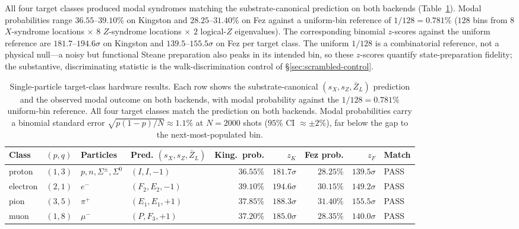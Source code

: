 \documentclass[11pt]{article}
\newcommand{\barZ}{\bar Z_L}
\begin{document}
All four target classes produced modal syndromes matching the substrate-canonical prediction on both backends (Table~\ref{tab:phase2-target-results}).  Modal probabilities range $36.55$--$39.10\%$ on Kingston and $28.25$--$31.40\%$ on Fez against a uniform-bin reference of $1 / 128 = 0.781\%$ ($128$ bins from $8$ $X$-syndrome locations $\times$ $8$ $Z$-syndrome locations $\times$ $2$ logical-$Z$ eigenvalues).  The corresponding binomial $z$-scores against the uniform reference are $181.7$--$194.6\sigma$ on Kingston and $139.5$--$155.5\sigma$ on Fez per target class.  The uniform $1/128$ is a combinatorial reference, not a physical null---a noisy but functional Steane preparation also peaks in its intended bin, so these $z$-scores quantify state-preparation fidelity; the substantive, discriminating statistic is the walk-discrimination control of \S\ref{sec:scrambled-control}.

\begin{table}[H]
\centering
\caption{Single-particle target-class hardware results.  Each row shows the substrate-canonical $(s_X, s_Z, \barZ)$ prediction and the observed modal outcome on both backends, with modal probability against the $1 / 128 = 0.781\%$ uniform-bin reference.  All four target classes match the prediction on both backends.  Modal probabilities carry a binomial standard error $\sqrt{p(1-p)/N} \approx 1.1\%$ at $N = 2000$ shots ($95\%$ CI $\approx \pm 2\%$), far below the gap to the next-most-populated bin.}
\label{tab:phase2-target-results}
\small
\begin{tabular}{llllrrrrl}
\toprule
Class & $(p, q)$ & Particles & Pred. $(s_X, s_Z, \barZ)$ & King.\ prob. & $z_K$ & Fez prob. & $z_F$ & Match \\
\midrule
proton   & $(1, 3)$ & $p, n, \Sigma^\pm, \Sigma^0$ & $(I, I, -1)$       & $36.55\%$ & $181.7\sigma$ & $28.25\%$ & $139.5\sigma$ & PASS \\
electron & $(2, 1)$ & $e^-$                        & $(F_2, E_2, -1)$   & $39.10\%$ & $194.6\sigma$ & $30.15\%$ & $149.2\sigma$ & PASS \\
pion     & $(3, 5)$ & $\pi^+$                      & $(E_1, E_1, +1)$   & $37.85\%$ & $188.3\sigma$ & $31.40\%$ & $155.5\sigma$ & PASS \\
muon     & $(1, 8)$ & $\mu^-$                      & $(P, F_3, +1)$     & $37.20\%$ & $185.0\sigma$ & $28.35\%$ & $140.0\sigma$ & PASS \\
\bottomrule
\end{tabular}
\end{table}
\end{document}

